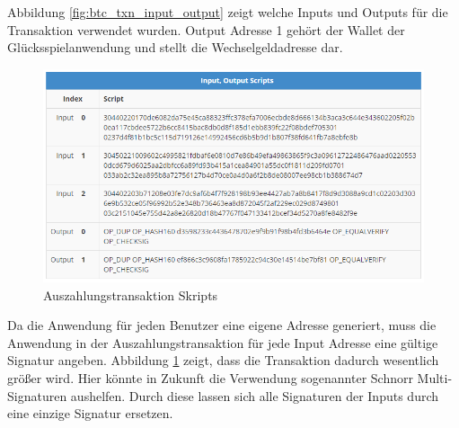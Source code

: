 Abbildung \ref{fig:btc_txn_input_output} zeigt welche Inputs und Outputs für die Transaktion verwendet wurden. Output Adresse 1 gehört der Wallet der Glücksspielanwendung und stellt die Wechselgeldadresse dar.


\begin{figure}[H]
\centering
\includegraphics[width=1\linewidth]{Figures/btc_gui/btc_txn_input_output_scripts}
\decoRule
\caption{Auszahlungstransaktion Skripts}
\label{fig:btc_txn_input_output_scripts}
\end{figure}

Da die Anwendung für jeden Benutzer eine eigene Adresse generiert, muss die Anwendung in der Auszahlungstransaktion für jede Input Adresse eine gültige Signatur angeben. Abbildung \ref{fig:btc_txn_input_output_scripts} zeigt, dass die Transaktion dadurch wesentlich größer wird. Hier könnte in Zukunft die Verwendung sogenannter Schnorr Multi-Signaturen \cite{schnorr_sig} aushelfen. Durch diese lassen sich alle Signaturen der Inputs durch eine einzige Signatur ersetzen.

